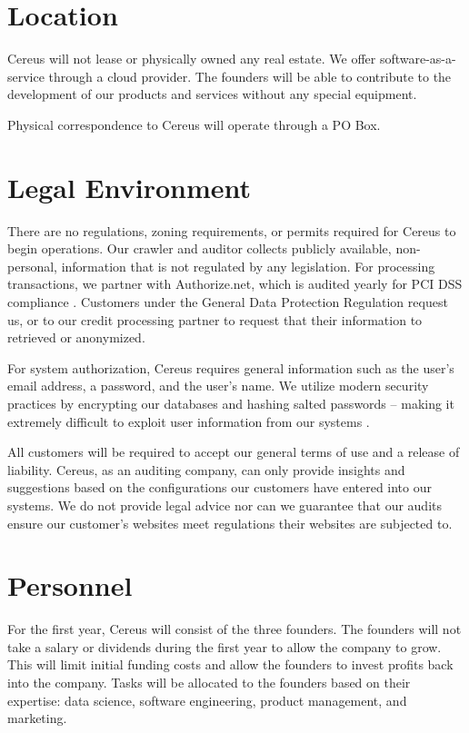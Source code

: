 \section{Location}

Cereus will not lease or physically owned any real estate. We offer software-as-a-service through a cloud provider. The founders will be able to contribute to the development of our products and services without any special equipment. 

Physical correspondence to Cereus will operate through a PO Box. 

\section{Legal Environment} \label{legal.environment}

There are no regulations, zoning requirements, or permits required for Cereus to begin operations. Our crawler and auditor collects publicly available, non-personal, information that is not regulated by any legislation. For processing transactions, we partner with Authorize.net, which is audited yearly for PCI DSS compliance \cite{authnet.2020}. Customers under the General Data Protection Regulation request us, or to our credit processing partner to request that their information to retrieved or anonymized.

For system authorization, Cereus requires general information such as the user's email address, a password, and the user's name. We utilize modern security practices by encrypting our databases and hashing salted passwords -- making it extremely difficult to exploit user information from our systems \cite{aprn.security.2015}.

All customers will be required to accept our general terms of use and a release of liability. Cereus, as an auditing company, can only provide insights and suggestions based on the configurations our customers have entered into our systems. We do not provide legal advice nor can we guarantee that our audits ensure our customer's websites meet regulations their websites are subjected to.

\section{Personnel}

For the first year, Cereus will consist of the three founders. The founders will not take a salary or dividends during the first year to allow the company to grow. This will limit initial funding costs and allow the founders to invest profits back into the company. Tasks will be allocated to the founders based on their expertise: data science, software engineering, product management, and marketing.

